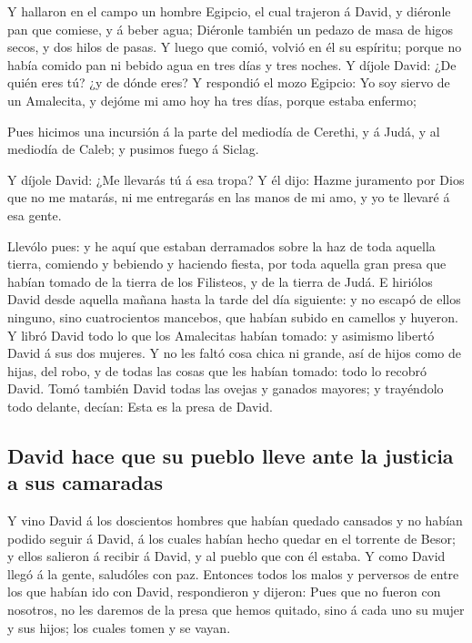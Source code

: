  Y hallaron en el campo un hombre Egipcio, el cual trajeron
á David, y diéronle pan que comiese, y á beber agua; 
Diéronle también un pedazo de masa de higos secos, y dos hilos de pasas.
Y luego que comió, volvió en él su espíritu; porque no había comido pan
ni bebido agua en tres días y tres noches.  Y díjole David:
¿De quién eres tú? ¿y de dónde eres? Y respondió el mozo Egipcio: Yo soy
siervo de un Amalecita, y dejóme mi amo hoy ha tres días, porque estaba
enfermo;

 Pues hicimos una incursión á la parte del mediodía de
Cerethi, y á Judá, y al mediodía de Caleb; y pusimos fuego á Siclag.

 Y díjole David: ¿Me llevarás tú á esa tropa? Y él dijo:
Hazme juramento por Dios que no me matarás, ni me entregarás en las
manos de mi amo, y yo te llevaré á esa gente.

 Llevólo pues: y he aquí que estaban derramados sobre la
haz de toda aquella tierra, comiendo y bebiendo y haciendo fiesta, por
toda aquella gran presa que habían tomado de la tierra de los Filisteos,
y de la tierra de Judá.  E hiriólos David desde aquella
mañana hasta la tarde del día siguiente: y no escapó de ellos ninguno,
sino cuatrocientos mancebos, que habían subido en camellos y huyeron.
 Y libró David todo lo que los Amalecitas habían tomado: y
asimismo libertó David á sus dos mujeres.  Y no les faltó
cosa chica ni grande, así de hijos como de hijas, del robo, y de todas
las cosas que les habían tomado: todo lo recobró David. 
Tomó también David todas las ovejas y ganados mayores; y trayéndolo todo
delante, decían: Esta es la presa de David.

\hypertarget{david-hace-que-su-pueblo-lleve-ante-la-justicia-a-sus-camaradas}{%
\subsection{David hace que su pueblo lleve ante la justicia a sus
camaradas}\label{david-hace-que-su-pueblo-lleve-ante-la-justicia-a-sus-camaradas}}

 Y vino David á los doscientos hombres que habían quedado
cansados y no habían podido seguir á David, á los cuales habían hecho
quedar en el torrente de Besor; y ellos salieron á recibir á David, y al
pueblo que con él estaba. Y como David llegó á la gente, saludóles con
paz.  Entonces todos los malos y perversos de entre los que
habían ido con David, respondieron y dijeron: Pues que no fueron con
nosotros, no les daremos de la presa que hemos quitado, sino á cada uno
su mujer y sus hijos; los cuales tomen y se vayan.

